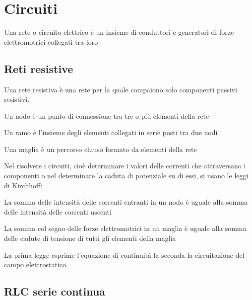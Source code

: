 \chapter{Circuiti}
\minitoc
\begin{Def}
  Una rete o circuito elettrico è un insieme di conduttori e generatori di forze elettromotrici collegati tra loro
\end{Def}
\section{Reti resistive}
Una rete resistiva è una rete per la quale compaiono solo componenti passivi resistivi.
\begin{Def}
  Un nodo è un punto di connessione tra tre o più elementi della rete
\end{Def}
\begin{Def}
  Un ramo è l'insieme degli elementi collegati in serie posti tra due nodi
\end{Def}
\begin{Def}
  Una maglia è un percorso chiuso formato da elementi della rete
\end{Def}
Nel risolvere i circuiti, cioè determinare i valori delle correnti che attraversano i componenti o nel determinare la caduta di potenziale su di essi, si usano le leggi di Kirchhoff:
\begin{legge}
  La somma delle intensità delle correnti entranti in un nodo è uguale alla somma delle intensità delle correnti uscenti
\end{legge}
\begin{legge}
  La somma col segno delle forze elettromotrici in un maglia è uguale alla somma delle cadute di tensione di tutti gli elementi della maglia
\end{legge}
La prima legge esprime l'equazione di continuità la seconda la circuitazione del campo elettrostatico.
\section{RLC serie continua}

